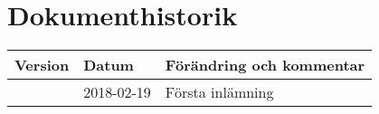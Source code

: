 \section*{Dokumenthistorik}

\begin{center}
    \begin{tabular}{| l | l | l | }
        \hline
        \textbf{Version} & \textbf{Datum} & \textbf{Förändring och kommentar} \\
        \hline
        \centering 1 & 2018-02-19 & Första inlämning\\
        \hline
    \end{tabular}
\end{center}